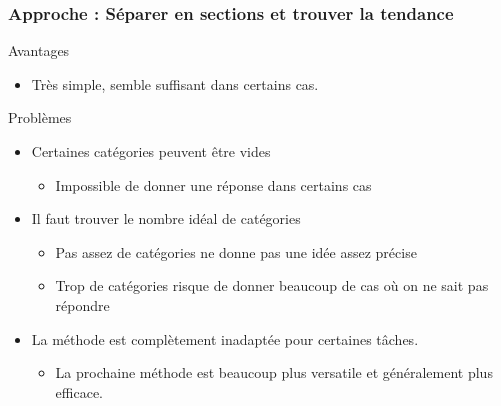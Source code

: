 \documentclass[french]{beamer}
\begin{document}
\begin{frame}
\frametitle{Approche : Séparer en sections et trouver la tendance}

{Avantages}

\begin{itemize}
\itemsep1pt\parskip0pt
\item
  Très simple, semble suffisant dans certains cas.
\end{itemize}
\pause
{Problèmes}

\begin{itemize}
\itemsep1pt\parskip0pt
\item
  Certaines catégories peuvent être vides

  \begin{itemize}
  \itemsep1pt\parskip0pt
  \item
    Impossible de donner une réponse dans certains cas
  \end{itemize}
\item
\pause
  Il faut trouver le nombre idéal de catégories

  \begin{itemize}
  \itemsep1pt\parskip0pt
  \item
    Pas assez de catégories ne donne pas une idée assez précise
  \item
    Trop de catégories risque de donner beaucoup de cas où on ne sait
    pas répondre
  \end{itemize}
\pause
  \item La méthode est complètement inadaptée pour certaines tâches.
  \begin{itemize}
	\item La prochaine méthode est beaucoup plus versatile et généralement plus efficace.  
  
  \end{itemize}  	
	
\end{itemize}
\end{frame}
\end{document}
